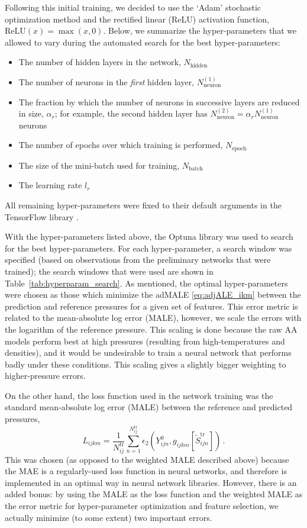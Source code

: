 \documentclass[%
 preprint,
 superscriptaddress,
 amsmath,amssymb,
longbibliography,
]{revtex4-2}
\begin{document}
Following this initial training, we decided to use the `Adam' stochastic optimization method \cite{Adam_optimizer} and the rectified linear (ReLU) activation function, $\textrm{ReLU}(x) = \max(x,0)$. Below, we summarize the hyper-parameters that we allowed to vary during the automated search for the best hyper-parameters:
\begin{itemize}
    \item The number of hidden layers in the network, $N_\textrm{hidden}$
    \item The number of neurons in the \emph{first} hidden layer, $N_\textrm{neuron}^{(1)}$
    \item The fraction by which the number of neurons in successive layers are reduced in size, $\alpha_r$; for example, the second hidden layer has $N_
    \textrm{neuron}^{(2)} = \alpha_r N_\textrm{neuron}^{(1)}$ neurons
    \item The number of epochs over which training is performed, $N_\textrm{epoch}$
    \item The size of the mini-batch used for training, $N_\textrm{batch}$
    \item The learning rate $l_r$
\end{itemize}
All remaining hyper-parameters were fixed to their default arguments in the TensorFlow library \cite{tensorflow2015-whitepaper}.

With the hyper-parameters listed above, the Optuna library \cite{optuna_2019} was used to search for the best hyper-parameters. For each hyper-parameter, a search window was specified (based on observations from the preliminary networks that were trained); the search windows that were used are shown in Table~\ref{tab:hyperparam_search}. As mentioned, the optimal hyper-parameters were chosen as those which minimize the adMALE  \eqref{eq:adjALE_ikm} between the prediction and reference pressures for a given set of features. This error metric is related to the mean-absolute log error (MALE), however, we scale the errors with the logarithm of the reference pressure. This scaling is done because the raw AA models perform best at high pressures (resulting from high-temperatures and densities), and it would be undesirable to train a neural network that performs badly under these conditions. This scaling gives a slightly bigger weighting to higher-pressure errors.

On the other hand, the loss function used in the network training was the standard mean-absolute log error (MALE) between the reference and predicted pressures,
\begin{equation}\label{eq:Likm}
    L_{ijkm} = \frac{1}{N_{ij}^\textrm{tr}}\sum_{n=1}^{N_{ij}^\textrm{tr}}\epsilon_2(Y^0_{ijn}, g_{ijkm}[\tilde{S}_{ijn}^\textrm{tr}])\,.
\end{equation}
This was chosen (as opposed to the weighted MALE described above) because the MAE is a regularly-used loss function in neural networks, and therefore is implemented in an optimal way in neural network libraries. However, there is an added bonus: by using the MALE as the loss function and the weighted MALE as the error metric for hyper-parameter optimization and feature selection, we actually minimize (to some extent) two important errors.
\end{document}

